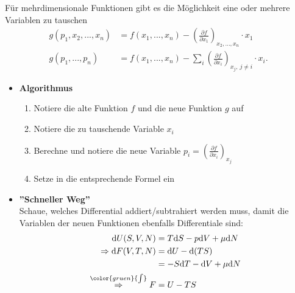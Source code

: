 \documentclass{article}
\newcommand{\diff}{\mathrm{d}}
\newcommand{\lr}[1]{\left(#1\right)}
\newcommand{\comment}[1]{{\color{gruen} {#1}}}
\begin{document}
Für mehrdimensionale Funktionen gibt es die Möglichkeit eine oder mehrere Variablen zu tauschen
	\begin{align*}
		g(p_1, x_2, ..., x_n) &= f(x_1,...,x_n) - \lr{ \frac{\partial f}{\partial x_1} }_{x_2,...,x_n} \cdot x_1 \\
		g(p_1, ..., p_n) &= f(x_1,...,x_n) - \sum_{i} \lr{ \frac{\partial f}{\partial x_i} }_{x_j,\ j\neq i} \cdot x_i.
	\end{align*}

\begin{itemize}
	\item \textbf{Algorithmus}\\
		\begin{enumerate}
			\item Notiere die alte Funktion $f$ und die neue Funktion $g$ auf
			\item Notiere die zu tauschende Variable $x_i$
			\item Berechne und notiere die neue Variable $p_i = \lr{ \frac{\partial f}{\partial x_i} }_{x_j}$
			\item Setze in die entsprechende Formel ein
		\end{enumerate}
		
	
	\item \textbf{''Schneller Weg''}\\
	Schaue, welches Differential addiert/subtrahiert werden muss, damit die Variablen der neuen Funktionen ebenfalls Differentiale sind:
	{\color{blue}
		\begin{align*}
			\diff U(S,V,N) &= T\diff S - p \diff V + \mu\diff N \\
			\Rightarrow \diff F(V,T,N) &= \diff U - \diff(TS) \\
			&= -S \diff T - \diff V + \mu\diff N \\
			\stackrel{\comment{\int}}{\Rightarrow} F &= U - TS
		\end{align*}
	}
\end{itemize}






\vspace{0.5cm}
\end{document}
